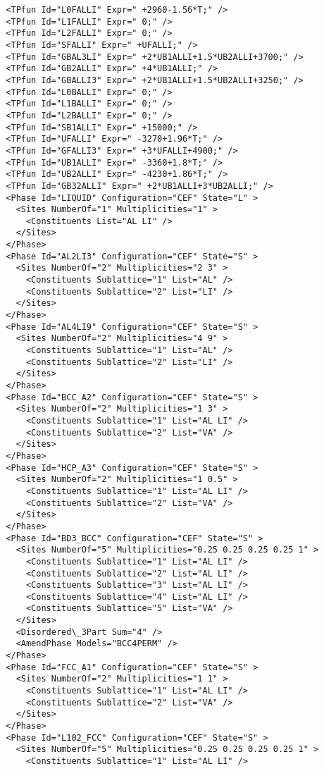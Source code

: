 \documentclass{article}
\begin{document}
\begin{appendices}
\begin{verbatim}
  <TPfun Id="L0FALLI" Expr=" +2960-1.56*T;" /> 
  <TPfun Id="L1FALLI" Expr=" 0;" /> 
  <TPfun Id="L2FALLI" Expr=" 0;" /> 
  <TPfun Id="SFALLI" Expr=" +UFALLI;" /> 
  <TPfun Id="GBAL3LI" Expr=" +2*UB1ALLI+1.5*UB2ALLI+3700;" /> 
  <TPfun Id="GB2ALLI" Expr=" +4*UB1ALLI;" /> 
  <TPfun Id="GBALLI3" Expr=" +2*UB1ALLI+1.5*UB2ALLI+3250;" /> 
  <TPfun Id="L0BALLI" Expr=" 0;" /> 
  <TPfun Id="L1BALLI" Expr=" 0;" /> 
  <TPfun Id="L2BALLI" Expr=" 0;" /> 
  <TPfun Id="SB1ALLI" Expr=" +15000;" /> 
  <TPfun Id="UFALLI" Expr=" -3270+1.96*T;" /> 
  <TPfun Id="GFALLI3" Expr=" +3*UFALLI+4900;" /> 
  <TPfun Id="UB1ALLI" Expr=" -3360+1.8*T;" /> 
  <TPfun Id="UB2ALLI" Expr=" -4230+1.86*T;" /> 
  <TPfun Id="GB32ALLI" Expr=" +2*UB1ALLI+3*UB2ALLI;" /> 
  <Phase Id="LIQUID" Configuration="CEF" State="L" >
    <Sites NumberOf="1" Multiplicities="1" >
      <Constituents List="AL LI" />
    </Sites>
  </Phase>
  <Phase Id="AL2LI3" Configuration="CEF" State="S" >
    <Sites NumberOf="2" Multiplicities="2 3" >
      <Constituents Sublattice="1" List="AL" />
      <Constituents Sublattice="2" List="LI" />
    </Sites>
  </Phase>
  <Phase Id="AL4LI9" Configuration="CEF" State="S" >
    <Sites NumberOf="2" Multiplicities="4 9" >
      <Constituents Sublattice="1" List="AL" />
      <Constituents Sublattice="2" List="LI" />
    </Sites>
  </Phase>
  <Phase Id="BCC_A2" Configuration="CEF" State="S" >
    <Sites NumberOf="2" Multiplicities="1 3" >
      <Constituents Sublattice="1" List="AL LI" />
      <Constituents Sublattice="2" List="VA" />
    </Sites>
  </Phase>
  <Phase Id="HCP_A3" Configuration="CEF" State="S" >
    <Sites NumberOf="2" Multiplicities="1 0.5" >
      <Constituents Sublattice="1" List="AL LI" />
      <Constituents Sublattice="2" List="VA" />
    </Sites>
  </Phase>
  <Phase Id="BD3_BCC" Configuration="CEF" State="S" >
    <Sites NumberOf="5" Multiplicities="0.25 0.25 0.25 0.25 1" >
      <Constituents Sublattice="1" List="AL LI" />
      <Constituents Sublattice="2" List="AL LI" />
      <Constituents Sublattice="3" List="AL LI" />
      <Constituents Sublattice="4" List="AL LI" />
      <Constituents Sublattice="5" List="VA" />
    </Sites>
    <Disordered\_3Part Sum="4" />
    <AmendPhase Models="BCC4PERM" />
  </Phase>
  <Phase Id="FCC_A1" Configuration="CEF" State="S" >
    <Sites NumberOf="2" Multiplicities="1 1" >
      <Constituents Sublattice="1" List="AL LI" />
      <Constituents Sublattice="2" List="VA" />
    </Sites>
  </Phase>
  <Phase Id="L102_FCC" Configuration="CEF" State="S" >
    <Sites NumberOf="5" Multiplicities="0.25 0.25 0.25 0.25 1" >
      <Constituents Sublattice="1" List="AL LI" />

\end{verbatim}
\end{appendices}
\end{document}

